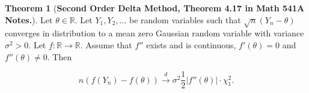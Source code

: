 \documentclass{article}
\theoremstyle{definition}
\newtheorem{theorem}{Theorem}
\theoremstyle{definition}
\theoremstyle{definition}
\theoremstyle{definition}
\theoremstyle{definition}
\theoremstyle{definition}
\theoremstyle{definition}
\begin{document}
\begin{theorem}[\textbf{Second Order Delta Method, Theorem 4.17 in Math 541A Notes.}]Let \(\theta \in \mathbb{R}\). Let \(Y_1, Y_2, \ldots\) be random variables such that \(\sqrt{n}(Y_n - \theta)\) converges in distribution to a mean zero Gaussian random variable with variance \(\sigma^2 > 0\). Let \(f: \mathbb{R} \to \mathbb{R}\). Assume that \(f''\) exists and is continuous, \(f'(\theta) = 0\) and \(f''(\theta) \neq 0\). Then

\[
n(f(Y_n) - f(\theta)) \xrightarrow{d} \sigma^2 \frac{1}{2} | f''(\theta)| \cdot \chi_1^2.
\]


\end{theorem}
\end{document}
